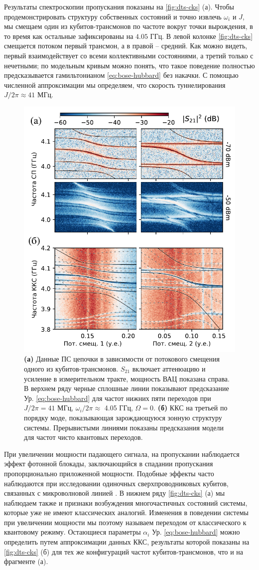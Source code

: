 \documentclass[14pt, a4paper]{extarticle}
\begin{document}
Результаты спектроскопии пропускания показаны на \autoref{fig:dts-cks} (а). Чтобы продемонстрировать структуру собственных состояний и точно извлечь $\omega_i$ и $J$, мы смещаем один из кубитов\hyp трансмонов по частоте вокруг точки вырождения, в то время как остальные зафиксированы на $4.05$ ГГц. В левой колонке \autoref{fig:dts-cks} смещается потоком первый трансмон, а в правой -- средний. Как можно видеть, первый взаимодействует со всеми коллективными состояниями, а третий только с нечетными; по модельным кривым можно понять, что такое поведение полностью предсказывается гамильтонианом \eqref{eq:bose-hubbard} без накачки. С помощью численной аппроксимации мы определяем, что скорость туннелирования $J/2\pi\approx 41$ МГц.
	
	\begin{figure}[t]
		\centering
		\includegraphics[width=0.6\linewidth]{Pictures/DTS-CKS}
		\caption{\textbf{(а)} Данные ПС цепочки в зависимости от потокового смещения одного из кубитов\hyp трансмонов. $S_{21}$ включает аттенюацию и усиление в измерительном тракте, мощность ВАЦ показана справа. В верхнем ряду черные сплошные линии показывают предсказание Ур. \eqref{eq:bose-hubbard} для частот нижних пяти переходов при $J/2\pi = 41$ МГц, $\omega_i/2\pi \approx$ 4.05 ГГц, $\Omega=0$. \textbf{(б)} ККС на третьей по порядку моде, показывающая зарождающуюся зонную структуру системы. Прерывистыми линиями показаны предсказания модели для частот чисто квантовых переходов.}
		\label{fig:dts-cks}
	\end{figure}

При увеличении мощности падающего сигнала, на пропускании наблюдается эффект фотонной блокады, заключающийся в спадании пропускания пропорционально приложенной мощности. Подобные эффекты часто наблюдаются при исследовании одиночных сверхпроводниковых кубитов, связанных с микроволновой линией . В нижнем ряду \autoref{fig:dts-cks} (а) мы наблюдаем также и признаки возбуждения многочастичных состояний системы, которые уже не имеют классических аналогий. Изменения в поведении системы при увеличении мощности мы поэтому называем переходом от классического к квантовому режиму. Остающиеся параметры $\alpha_i$ Ур. \eqref{eq:bose-hubbard} можно определить путем аппроксимации данных ККС, результаты которой показаны на \autoref{fig:dts-cks} (б) для тех же конфигураций частот кубитов\hyp трансмонов, что и на фрагменте (а).
\end{document}
